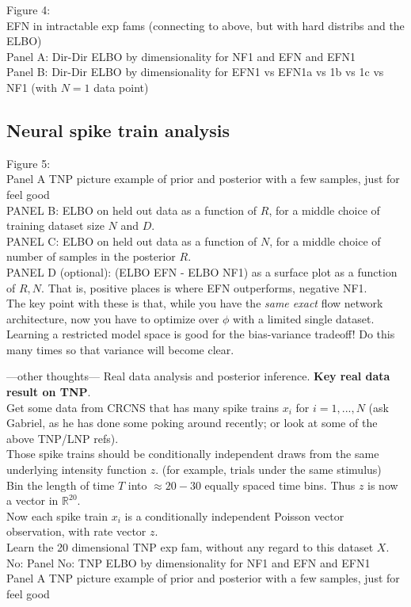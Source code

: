 \documentclass{article}
\begin{document}
Figure 4: \\
EFN in intractable exp fams (connecting to above, but with hard distribs and the ELBO) \\
Panel A: Dir-Dir ELBO by dimensionality for NF1 and EFN and EFN1\\
Panel B: Dir-Dir ELBO by dimensionality for EFN1 vs EFN1a vs 1b vs 1c vs NF1 (with $N=1$ data point)\\


\subsection{Neural spike train analysis}

Figure 5: \\
Panel A TNP picture example of prior and posterior with a few samples, just for feel good  \\
PANEL B: ELBO on held out data as a function of $R$, for a middle choice of training dataset size $N$ and $D$. \\ 
PANEL C: ELBO on held out data as a function of $N$, for a middle choice of number of samples in the posterior $R$. \\


PANEL D (optional): (ELBO EFN - ELBO NF1) as a surface plot as a function of $R,N$.  That is, positive places is where EFN outperforms, negative NF1. \\  
The key point with these is that, while you have the \emph{same exact} flow network architecture, now you have to optimize over $\phi$ with a limited single dataset.  Learning a restricted model space is good for the bias-variance tradeoff!  Do this many times so that variance will become clear.  


---other thoughts---
Real data analysis and posterior inference.  {\bf Key real data result on TNP}.  \\
Get some data from CRCNS that has many spike trains $x_i$ for $i=1,...,N$ (ask Gabriel, as he has done some poking around recently; or look at some of the above TNP/LNP refs). \\
Those spike trains should be conditionally independent draws from the same underlying intensity function $z$.  (for example, trials under the same stimulus)\\
Bin the length of time $T$ into $\approx 20-30$ equally spaced time bins.  Thus $z$ is now a vector in $\mathbb{R}^20$. \\
Now each spike train $x_i$ is a conditionally independent Poisson vector observation, with rate vector $z$.\\
Learn the 20 dimensional TNP exp fam, without any regard to this dataset $X$. \\
No: Panel No: TNP ELBO by dimensionality for NF1 and EFN and EFN1 \\
Panel A TNP picture example of prior and posterior with a few samples, just for feel good  \\
\end{document}
